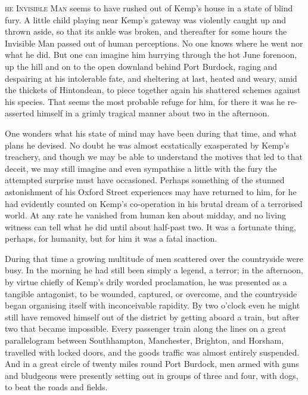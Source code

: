 \label{ch:26}
\begin{ChapterStart}
\vspace*{2\nbs}

\vspace{1.5\nbs}
\vspace{0.75\nbs}
\end{ChapterStart}

\kern-4pt\textsc{he Invisible Man} seems to have rushed out of Kemp’s house in a state of blind fury. A little child playing near Kemp’s gateway was violently caught up and thrown aside, so that its ankle was broken, and thereafter for some hours the Invisible Man passed out of human perceptions. No one knows where he went nor what he did. But one can imagine him hurrying through the hot June forenoon, up the hill and on to the open downland behind Port Burdock, raging and despairing at his intolerable fate, and sheltering at last, heated and weary, amid the thickets of Hintondean, to piece together again his shattered schemes against his species. That seems the most probable refuge for him, for there it was he re-asserted himself in a grimly tragical manner about two in the afternoon.

One wonders what his state of mind may have been during that time, and what plans he devised. No doubt he was almost ecstatically exasperated by Kemp’s treachery, and though we may be able to understand the motives that led to that deceit, we may still imagine and even sympathise a little with the fury the attempted surprise must have occasioned. Perhaps something of the stunned astonishment of his Oxford Street experiences may have returned to him, for he had evidently counted on Kemp’s co-operation in his brutal dream of a terrorised world. At any rate he vanished from human ken about midday, and no living witness can tell what he did until about half-past two. It was a fortunate thing, perhaps, for humanity, but for him it was a fatal inaction.

During that time a growing multitude of men scattered over the countryside were busy. In the morning he had still been simply a legend, a terror; in the afternoon, by virtue chiefly of Kemp’s drily worded proclamation, he was presented as a tangible antagonist, to be wounded, captured, or overcome, and the countryside began organising itself with inconceivable rapidity. By two o’clock even he might still have removed himself out of the district by getting aboard a train, but after two that became impossible. Every passenger train along the lines on a great parallelogram between Southhampton, Manchester, Brighton, and Horsham, travelled with locked doors, and the goods traffic was almost entirely suspended. And in a great circle of twenty miles round Port Burdock, men armed with guns and bludgeons were presently setting out in groups of three and four, with dogs, to beat the roads and fields.

